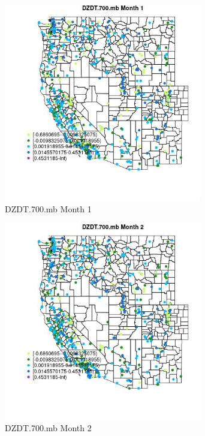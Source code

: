 \begin{figure} 
\centering  
\includegraphics[width=0.77\textwidth]{Code_Outputs/Report_ML_input_PM25_Step4_part_e_de_duplicated_aves_compiled_2019-05-14wNAs_MapObsMo1DZDT700mb.jpg} 
\caption{\label{fig:Report_ML_input_PM25_Step4_part_e_de_duplicated_aves_compiled_2019-05-14wNAsMapObsMo1DZDT700mb}DZDT.700.mb Month 1} 
\end{figure} 
 

\begin{figure} 
\centering  
\includegraphics[width=0.77\textwidth]{Code_Outputs/Report_ML_input_PM25_Step4_part_e_de_duplicated_aves_compiled_2019-05-14wNAs_MapObsMo2DZDT700mb.jpg} 
\caption{\label{fig:Report_ML_input_PM25_Step4_part_e_de_duplicated_aves_compiled_2019-05-14wNAsMapObsMo2DZDT700mb}DZDT.700.mb Month 2} 
\end{figure} 
 

